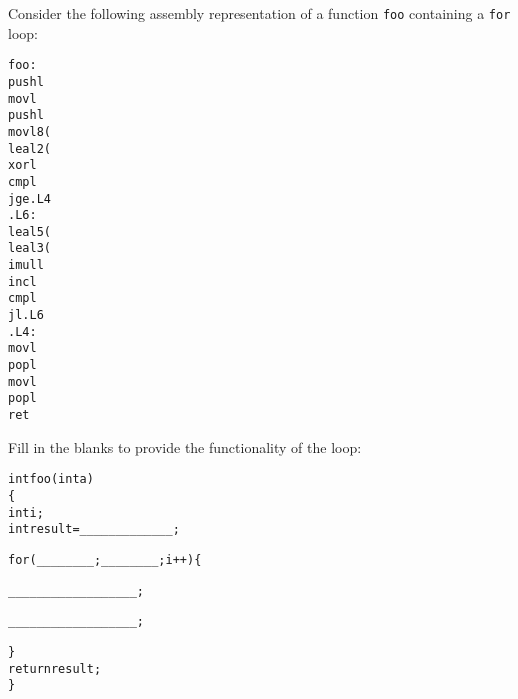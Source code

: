 \begin{problem}{8}

Consider the following assembly representation of a function
{\tt foo} containing a {\tt for} loop:

\begin{scode}
\begin{alltt}
foo:{\em\scriptsize }
  pushl %ebp{\em\scriptsize }
  movl %esp,%ebp{\em\scriptsize }
  pushl %ebx{\em\scriptsize }
  movl 8(%ebp),%ebx{\em\scriptsize }
  leal 2(%ebx),%edx{\em\scriptsize }
  xorl %ecx,%ecx{\em\scriptsize }
  cmpl %ebx,%ecx{\em\scriptsize }
  jge .L4{\em\scriptsize }
.L6:{\em\scriptsize }
  leal 5(%ecx,%edx),%edx{\em\scriptsize }
  leal 3(%ecx),%eax{\em\scriptsize }
  imull %eax,%edx{\em\scriptsize }
  incl %ecx{\em\scriptsize }
  cmpl %ebx,%ecx{\em\scriptsize }
  jl .L6{\em\scriptsize }
.L4:{\em\scriptsize }
  movl %edx,%eax{\em\scriptsize }
  popl %ebx{\em\scriptsize }
  movl %ebp,%esp{\em\scriptsize }
  popl %ebp{\em\scriptsize }
  ret{\em\scriptsize }
\end{alltt}
\end{scode}

Fill in the blanks to provide the functionality of the loop:

{\small
\begin{alltt}
int foo(int a)
\{
    int i;
    int result = _____________;

    for( ________; ________; i++ ) \{

        __________________;

        __________________;

    \}
    return result;
\}
\end{alltt}
}

\end{problem}
